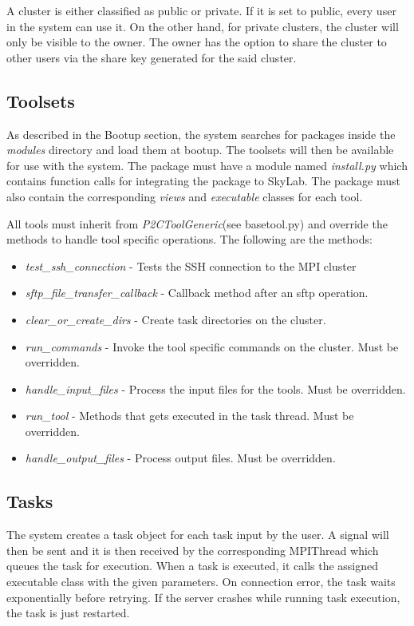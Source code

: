 A cluster is either classified as public or private. If it is set to public, every user in the system can use it. On the other hand, for private clusters, the cluster will only be visible to the owner. The owner has the option to share the cluster to other users via the share key generated for the said cluster. 		

\subsection{Toolsets} 
As described in the Bootup section, the system searches for packages inside the \textit{modules} directory and load them at bootup. The toolsets will then be available for use with the system. The package must have a module named \textit{install.py} which contains function calls for integrating the package to  SkyLab. The package must also contain the corresponding \textit{views} and \textit{executable} classes for each tool.

All tools must inherit from \textit{P2CToolGeneric}(see basetool.py) and override the methods to handle tool specific operations. The following are the methods:

\begin{itemize}
	\item \textit{test\_ssh\_connection} - Tests the SSH connection to the MPI cluster
	\item \textit{sftp\_file\_transfer\_callback} - Callback method after an sftp operation.
	\item \textit{clear\_or\_create\_dirs} - Create task directories on the cluster.
	\item \textit{run\_commands} - Invoke the tool specific commands on the cluster. Must be overridden.
	\item \textit{handle\_input\_files} - Process the input files for the tools. Must be overridden.
	\item \textit{run\_tool} - Methods that gets executed in the task thread. Must be overridden.
	\item \textit{handle\_output\_files} - Process output files. Must be overridden.
\end{itemize}




\subsection{Tasks} 
The system creates a task object for each task input by the user. A signal will then be sent and it is then received by the corresponding MPIThread which queues the task for execution. When a task is executed, it calls the assigned executable class with the given parameters. On connection error, the task waits exponentially before retrying. If the server crashes while running task execution, the task is just restarted.				
		

